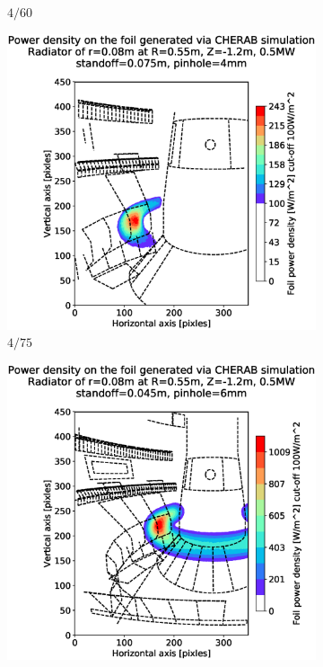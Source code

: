 \begin{figure}
\begin{subfigure}{0.31\textwidth}
         \caption{$4/60$}
         \label{fig:4_60}
     \end{subfigure}
     \hfill
     \begin{subfigure}{0.325\textwidth}
         \centering
         \includegraphics[trim={85 25 40 80},clip,width=\textwidth]{Chapters/chapter2/figs/measured_power_4_75radiator_R0.55_Z-1.2_r0.08.stl.eps}
         \caption{$4/75$}
         \label{fig:$4_75$}
     \end{subfigure}
     \begin{subfigure}{0.32\textwidth}
         \centering
         \includegraphics[trim={85 25 49 80},clip,width=\textwidth]{Chapters/chapter2/figs/measured_power_6_45radiator_R0.55_Z-1.2_r0.08.stl.eps}

\end{subfigure}
\end{figure}

